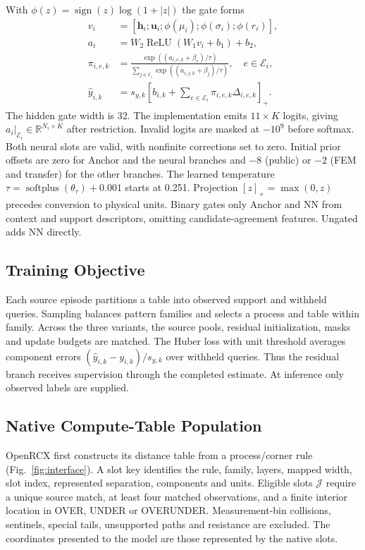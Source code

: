 With $\phi(z)=\operatorname{sign}(z)\log(1+|z|)$ the gate forms
\begin{align}
v_i&=[\mathbf h_i;\mathbf u_i;\phi(\mu_i);\phi(\sigma_i);\phi(r_i)],\\
a_i&=W_2\operatorname{ReLU}(W_1v_i+b_1)+b_2,\\
\pi_{i,e,k}&=\frac{\exp((a_{i,e,k}+\beta_e)/\tau)}
{\sum_{j\in\mathcal E_i}\exp((a_{i,j,k}+\beta_j)/\tau)},\quad e\in\mathcal E_i,\\
\widehat y_{i,k}&=s_{y,k}\left[b_{i,k}+
\sum_{e\in\mathcal E_i}\pi_{i,e,k}\Delta_{i,e,k}\right]_+ .
\end{align}
The hidden gate width is 32. The implementation emits $11\times K$ logits, giving $a_i|_{\mathcal E_i}\in\mathbb R^{N_i\times K}$ after restriction. Invalid logits are masked at $-10^9$ before softmax. Both neural slots are valid, with nonfinite corrections set to zero. Initial prior offsets are zero for Anchor and the neural branches and $-8$ (public) or $-2$ (FEM and transfer) for the other branches. The learned temperature $\tau=\operatorname{softplus}(\theta_\tau)+0.001$ starts at 0.251. Projection $[z]_+=\max(0,z)$ precedes conversion to physical units. Binary gates only Anchor and NN from context and support descriptors, omitting candidate-agreement features. Ungated adds NN directly.

\subsection{Training Objective}
Each source episode partitions a table into observed support and withheld queries. Sampling balances pattern families and selects a process and table within family. Across the three variants, the source pools, residual initialization, masks and update budgets are matched. The Huber loss with unit threshold averages component errors $(\widehat y_{i,k}-y_{i,k})/s_{y,k}$ over withheld queries. Thus the residual branch receives supervision through the completed estimate. At inference only observed labels are supplied.

\subsection{Native Compute-Table Population}
OpenRCX first constructs its distance table from a process/corner rule (Fig.~\ref{fig:interface}). A slot key identifies the rule, family, layers, mapped width, slot index, represented separation, components and units. Eligible slots $\mathcal J$ require a unique source match, at least four matched observations, and a finite interior location in OVER, UNDER or OVERUNDER. Measurement-bin collisions, sentinels, special tails, unsupported paths and resistance are excluded. The coordinates presented to the model are those represented by the native slots.

